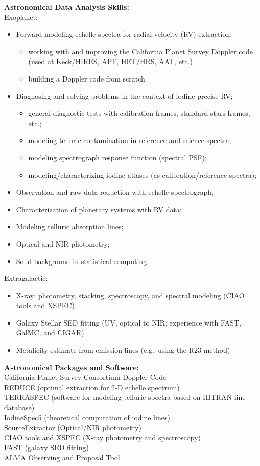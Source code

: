 \begin{small}
{\bf Astronomical Data Analysis Skills:}\\
Exoplanet:
\begin{itemize}
\item Forward modeling echelle spectra for radial velocity (RV) extraction;
  \begin{itemize}
  \item working with and improving the California
    Planet Survey Doppler code (used at Keck/HIRES, APF, HET/HRS, AAT,
    etc.)
  \item building a Doppler code from scratch
  \end{itemize}
\item Diagnosing and solving problems in the context of
  iodine precise RV;
  \begin{itemize}
  \item general diagnostic tests with calibration frames, standard stars
    frames, etc.;
  \item modeling telluric contamination in reference and science spectra;
  \item modeling spectrograph response function (spectral PSF);
  \item modeling/characterizing iodine atlases (as calibration/reference spectra);
  \end{itemize}
\item Observation and raw data reduction with echelle spectrograph;
\item Characterization of planetary systems with RV data;  
\item Modeling telluric absorption lines;
\item Optical and NIR photometry;
\item Solid background in statistical computing.
\end{itemize}

Extragalactic:
\begin{itemize}
\item X-ray: photometry, stacking, spectroscopy, and spectral modeling (CIAO
tools and XSPEC) 
\item Galaxy Stellar SED fitting (UV, optical to NIR; experience with FAST, GalMC, and CIGAR)
\item Metalicity estimate from emission lines (e.g.\ using the R23 method)  
\end{itemize}  

{\bf Astronomical Packages and Software:} \\
California Planet Survey Consortium Doppler Code\\
REDUCE (optimal extraction for 2-D echelle spectrum)\\
TERRASPEC (software for modeling telluric spectra based on HITRAN line
database)\\
IodineSpec5 (theoretical computation of iodine lines)\\
SourceExtractor (Optical/NIR photometry) \\
CIAO tools and XSPEC (X-ray photometry and spectroscopy)\\
FAST (galaxy SED fitting)\\
ALMA Observing and Proposal Tool
\vspace{10pt}


\end{small}
